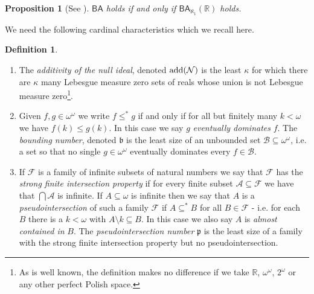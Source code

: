 \documentclass[leqno,11pt]{amsart}
\newtheorem{proposition}[theorem]{Proposition}
\theoremstyle{definition}
\newtheorem{definition}[theorem]{Definition}
\theoremstyle{remark}
\def\Null{\mathcal N}
\def\BA{\mathsf{BA}}
\def\baire{\omega^\omega}
\def\cantor{2^\omega}
\def\mfb{\mathfrak b}
\def\mfp{\mathfrak{p}}
\def\add{{\rm add}}
\begin{document}
\begin{proposition}[See \cite{Stepranswatson87}]
    $\BA$ holds if and only if $\BA_{\aleph_1}(\mathbb R)$ holds.
\end{proposition}

We need the following cardinal characteristics which we recall here.

\begin{definition}
    \begin{enumerate}
        \item The {\em additivity of the null ideal}, denoted $\add(\Null)$ is the least $\kappa$ for which there are $\kappa$ many Lebesgue measure zero sets of reals whose union is not Lebesgue measure zero\footnote{As is well known, the definition makes no difference if we take $\mathbb R$, $\baire$, $\cantor$ or any other perfect Polish space.}.

        \item Given $f, g \in \baire$ we write $f\leq^*g$ if and only if for all but finitely many $k < \omega$ we have $f(k) \leq g(k)$. In this case we say $g$ {\em eventually dominates} $f$. The {\em bounding number}, denoted $\mfb$ is the least size of an unbounded set $\mathcal B \subseteq \baire$, i.e. a set so that no single $g\in \baire$ eventually dominates every $f \in \mathcal B$.         

        \item If $\mathcal F$ is a family of infinite subsets of natural numbers we say that $\mathcal F$ has the {\em strong finite intersection property} if for every finite subset $\mathcal A \subseteq \mathcal F$ we have that $\bigcap \mathcal A$ is infinite. If $A \subseteq \omega$ is infinite then we say that $A$ is a {\em pseudointersection} of such a family $\mathcal F$ if $A \subseteq^* B$ for all $B \in \mathcal F$ - i.e. for each $B$ there is a $k < \omega$ with $A \setminus k \subseteq B$. In this case we also say $A$ is {\em almost contained in} $B$. The {\em pseudointersection number} $\mfp$ is the least size of a family with the strong finite intersection property but no pseudointersection. 

    \end{enumerate}
\end{definition}
\end{document}
